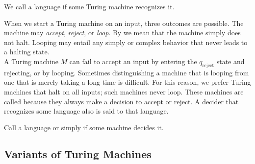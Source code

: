\documentclass{article}
\begin{document}
\begin{definition}
  We call a language  if some Turing machine recognizes it. 
\end{definition}

When we start a Turing machine on an input, three outcomes are possible. The machine may \emph{accept}, \emph{reject}, or \emph{loop}. By  we mean that the machine simply does not halt. Looping may entail any simply or complex behavior that never leads to a halting state. \\ 

A Turing machine $M$ can fail to accept an input by entering the $q_{\textrm{reject}}$ state and rejecting, or by looping. Sometimes distinguishing a machine that is looping from one that is merely taking a long time is difficult. For this reason, we prefer Turing machines that halt on all inputs; such machines never loop. These machines are called  because they always make a decision to accept or reject. A decider that recognizes some language also is said to  that language. 

\begin{definition}
  Call a language  or simply  if some machine decides it.
\end{definition}

\subsection{Variants of Turing Machines} 

\end{document}
